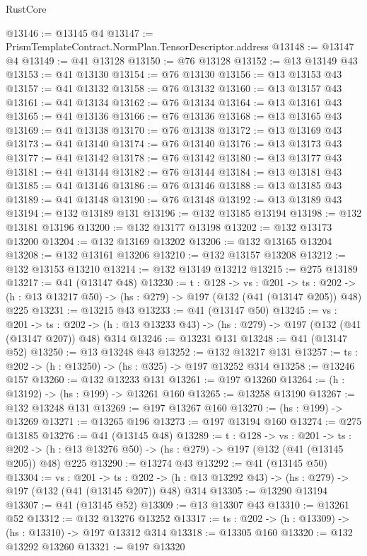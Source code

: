 \begin{lexlean}{RustCore}
\begin{coremodule}
@13146 := @13145 @4
@13147 := PrismTemplateContract.NormPlan.TensorDescriptor.address
@13148 := @13147 @4
@13149 := @41 @13128
@13150 := @76 @13128
@13152 := @13 @13149 @43
@13153 := @41 @13130
@13154 := @76 @13130
@13156 := @13 @13153 @43
@13157 := @41 @13132
@13158 := @76 @13132
@13160 := @13 @13157 @43
@13161 := @41 @13134
@13162 := @76 @13134
@13164 := @13 @13161 @43
@13165 := @41 @13136
@13166 := @76 @13136
@13168 := @13 @13165 @43
@13169 := @41 @13138
@13170 := @76 @13138
@13172 := @13 @13169 @43
@13173 := @41 @13140
@13174 := @76 @13140
@13176 := @13 @13173 @43
@13177 := @41 @13142
@13178 := @76 @13142
@13180 := @13 @13177 @43
@13181 := @41 @13144
@13182 := @76 @13144
@13184 := @13 @13181 @43
@13185 := @41 @13146
@13186 := @76 @13146
@13188 := @13 @13185 @43
@13189 := @41 @13148
@13190 := @76 @13148
@13192 := @13 @13189 @43
@13194 := @132 @13189 @131
@13196 := @132 @13185 @13194
@13198 := @132 @13181 @13196
@13200 := @132 @13177 @13198
@13202 := @132 @13173 @13200
@13204 := @132 @13169 @13202
@13206 := @132 @13165 @13204
@13208 := @132 @13161 @13206
@13210 := @132 @13157 @13208
@13212 := @132 @13153 @13210
@13214 := @132 @13149 @13212
@13215 := @275 @13189
@13217 := @41 (@13147 @48)
@13230 := {t : @128} ->
  {vs : @201} ->
  {ts : @202} -> (h : @13 @13217 @50) -> (hs : @279) -> @197 (@132 (@41 (@13147 @205)) @48) @225
@13231 := @13215 @43
@13233 := @41 (@13147 @50)
@13245 := {vs : @201} ->
  {ts : @202} -> (h : @13 @13233 @43) -> (hs : @279) -> @197 (@132 (@41 (@13147 @207)) @48) @314
@13246 := @13231 @131
@13248 := @41 (@13147 @52)
@13250 := @13 @13248 @43
@13252 := @132 @13217 @131
@13257 := {ts : @202} -> (h : @13250) -> (hs : @325) -> @197 @13252 @314
@13258 := @13246 @157
@13260 := @132 @13233 @131
@13261 := @197 @13260
@13264 := (h : @13192) -> (hs : @199) -> @13261 @160
@13265 := @13258 @13190
@13267 := @132 @13248 @131
@13269 := @197 @13267 @160
@13270 := (hs : @199) -> @13269
@13271 := @13265 @196
@13273 := @197 @13194 @160
@13274 := @275 @13185
@13276 := @41 (@13145 @48)
@13289 := {t : @128} ->
  {vs : @201} ->
  {ts : @202} -> (h : @13 @13276 @50) -> (hs : @279) -> @197 (@132 (@41 (@13145 @205)) @48) @225
@13290 := @13274 @43
@13292 := @41 (@13145 @50)
@13304 := {vs : @201} ->
  {ts : @202} -> (h : @13 @13292 @43) -> (hs : @279) -> @197 (@132 (@41 (@13145 @207)) @48) @314
@13305 := @13290 @13194
@13307 := @41 (@13145 @52)
@13309 := @13 @13307 @43
@13310 := @13261 @52
@13312 := @132 @13276 @13252
@13317 := {ts : @202} -> (h : @13309) -> (hs : @13310) -> @197 @13312 @314
@13318 := @13305 @160
@13320 := @132 @13292 @13260
@13321 := @197 @13320

\end{coremodule}
\end{lexlean}
